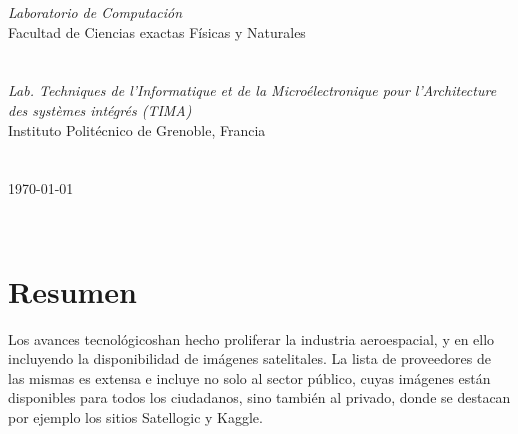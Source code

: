 \documentclass[a4paper,openright,12pt]{report}
\begin{document}
\begin{titlepage}
\begin{center}
\large \textit{Laboratorio de Computación}\\ Facultad de Ciencias exactas Físicas y Naturales
\large \textit{}\\
\large \textit{}\\
\large \textit{}\\
\large \textit{ Lab. Techniques de l'Informatique et de la Microélectronique pour l'Architecture des systèmes intégrés (TIMA)}\\ Instituto Politécnico de Grenoble, Francia
 \large \textit{}\\
  \large \textit{}\\
   \large \textit{}\\
{\large \today}\\[2cm] %
 
\vfill
\end{center}
\end{titlepage}


$\ $
\thispagestyle{empty} %
% 



\chapter*{Resumen} %

Los avances tecnológicoshan hecho proliferar la industria aeroespacial, y en ello incluyendo la disponibilidad de imágenes satelitales. La lista de proveedores de las mismas es extensa e incluye no solo al sector público, cuyas imágenes están disponibles para todos los ciudadanos, sino también al privado, donde se destacan por ejemplo los sitios Satellogic y Kaggle.
\end{document}
